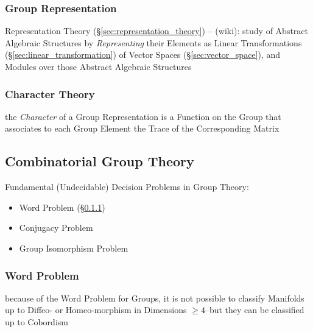 \subsubsection{Group Representation}\label{sec:group_representation}

\fist Representation Theory (\S\ref{sec:representation_theory}) -- (wiki): study
of Abstract Algebraic Structures by \emph{Representing} their Elements as Linear
Transformations (\S\ref{sec:linear_transformation}) of Vector Spaces
(\S\ref{sec:vector_space}), and Modules over those Abstract Algebraic Structures



\subsubsection{Character Theory}\label{sec:character_theory}

the \emph{Character} of a Group Representation is a Function on the Group that
associates to each Group Element the Trace of the Corresponding Matrix



\subsection{Combinatorial Group Theory}\label{sec:combinatorial_group_theory}

Fundamental (Undecidable) Decision Problems in Group Theory:
\begin{itemize}
  \item Word Problem (\S\ref{sec:word_problem})
  \item Conjugacy Problem
  \item Group Isomorphism Problem
\end{itemize}



\subsubsection{Word Problem}\label{sec:word_problem}

because of the Word Problem for Groups, it is not possible to classify
Manifolds up to Diffeo- or Homeo-morphism in Dimensions $\geq 4$--but they can
be classified up to Cobordism




